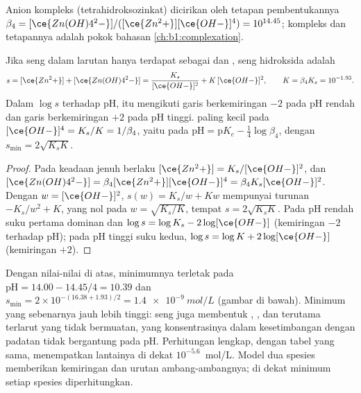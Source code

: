 Anion kompleks  (tetrahidroksozinkat) dicirikan oleh
tetapan pembentukannya $\beta_4 = [\ce{Zn(OH)4^2-}]/([\ce{Zn^2+}][\ce{OH-}]^4)
= 10^{14.45}$; kompleks dan tetapannya adalah pokok bahasan
\cref{ch:b1:complexation}.

\begin{proposition}\label{prop:b1:precipitation:amphoteric}
Jika seng dalam larutan hanya terdapat sebagai  dan
,  seng hidroksida adalah
\[
  s = [\ce{Zn^2+}] + [\ce{Zn(OH)4^2-}] = \frac{K_s}{[\ce{OH-}]^2} + K\,[\ce{OH-}]^2,
  \qquad K = \beta_4 K_s = 10^{-1.93} .
\]
Dalam $\log s$ terhadap pH,  itu mengikuti garis berkemiringan
$-2$ pada pH rendah dan garis berkemiringan $+2$ pada pH tinggi.
 paling kecil pada
$[\ce{OH-}]^4 = K_s/K = 1/\beta_4$, yaitu pada $\mathrm{pH} =
\mathrm{p}K_e - \frac14\log\beta_4$, dengan $s_{\min} = 2\sqrt{K_s K}$.
\end{proposition}

\begin{proof}
Pada keadaan jenuh berlaku $[\ce{Zn^2+}] = K_s/[\ce{OH-}]^2$, dan
$[\ce{Zn(OH)4^2-}] = \beta_4[\ce{Zn^2+}][\ce{OH-}]^4 = \beta_4 K_s
[\ce{OH-}]^2$. Dengan $w = [\ce{OH-}]^2$, $s(w) = K_s/w + Kw$ mempunyai turunan
$-K_s/w^2 + K$, yang nol pada $w = \sqrt{K_s/K}$, tempat $s = 2\sqrt{K_s K}$.
Pada pH rendah suku pertama dominan dan $\log s = \log K_s - 2\log[\ce{OH-}]$
(kemiringan $-2$ terhadap pH); pada pH tinggi suku kedua, $\log s = \log K + 2\log[\ce{OH-}]$
(kemiringan $+2$).
\end{proof}

Dengan nilai-nilai di atas, minimumnya terletak pada $\mathrm{pH} = 14.00 - 14.45/4
= 10.39$ dan $s_{\min} = 2 \times 10^{-(16.38 + 1.93)/2} =
\qty{1.4e-9}{mol/L}$
(gambar di bawah). Minimum yang sebenarnya jauh lebih tinggi: seng juga
membentuk , , dan terutama  terlarut
yang tidak bermuatan, yang konsentrasinya dalam kesetimbangan dengan
padatan tidak bergantung pada pH. Perhitungan lengkap, dengan tabel yang
sama, menempatkan lantainya di dekat
$10^{-5.6}$~mol/L. Model dua spesies memberikan kemiringan dan urutan
ambang-ambangnya; di dekat minimum setiap spesies diperhitungkan.

